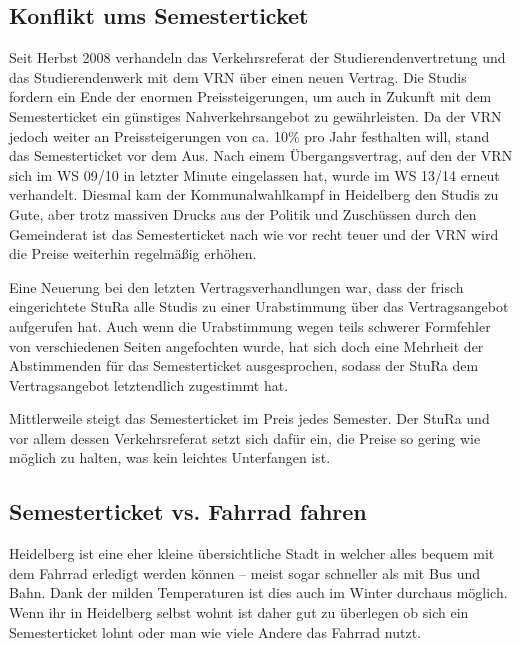 \subsection{Konflikt ums Semesterticket}
Seit Herbst 2008 verhandeln das Verkehrsreferat der Studierendenvertretung und
das Studierendenwerk mit dem VRN über einen neuen Vertrag. Die Studis fordern ein
Ende der enormen Preissteigerungen, um auch in Zukunft mit dem Semesterticket
ein günstiges Nahverkehrsangebot zu gewährleisten. Da der VRN jedoch weiter an
Preissteigerungen von ca. 10\% pro Jahr festhalten will, stand das
Semesterticket vor dem Aus. 
Nach einem Übergangsvertrag, auf den der VRN sich im WS 09/10 in letzter Minute
eingelassen hat, wurde im WS 13/14 erneut verhandelt. Diesmal kam der
Kommunalwahlkampf in Heidelberg den Studis zu Gute, aber trotz massiven Drucks
aus der Politik und Zuschüssen durch den Gemeinderat ist das Semesterticket
nach wie vor recht teuer und der VRN wird die Preise weiterhin regelmäßig
erhöhen.

Eine Neuerung bei den letzten Vertragsverhandlungen war, dass der frisch
eingerichtete \gls{StuRa} alle Studis zu einer Urabstimmung über das
Vertragsangebot aufgerufen hat. Auch wenn die Urabstimmung wegen teils schwerer
Formfehler von verschiedenen Seiten angefochten wurde, hat sich doch eine
Mehrheit der Abstimmenden für das Semesterticket ausgesprochen, sodass der
StuRa dem Vertragsangebot letztendlich zugestimmt hat.

Mittlerweile steigt das Semesterticket im Preis jedes Semester. Der StuRa und
vor allem dessen Verkehrsreferat setzt sich dafür ein, die Preise so gering wie
möglich zu halten, was kein leichtes Unterfangen ist.\\[1em]

\subsection{Semesterticket vs. Fahrrad fahren}

Heidelberg ist eine eher kleine übersichtliche Stadt in welcher alles bequem
mit dem Fahrrad erledigt werden können -- meist sogar schneller als mit Bus und
Bahn. Dank der milden Temperaturen ist dies auch im Winter durchaus möglich.
Wenn ihr in Heidelberg selbst wohnt ist daher gut zu überlegen ob sich ein
Semesterticket lohnt oder man wie viele Andere das Fahrrad nutzt.

